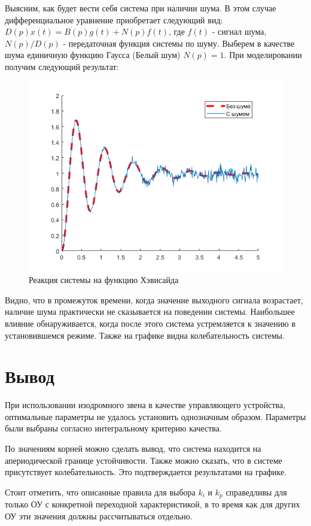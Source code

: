 \FloatBarrier

Выясним, как будет вести себя система при наличии шума. В этом случае
дифференциальное уравнение приобретает следующий вид:
$D(p)x(t) = B(p)g(t) + N(p)f(t)$, где $f(t)$ - сигнал шума, $N(p)/D(p)$ - передаточная
функция системы по шуму.
Выберем в качестве шума единичную функцию Гаусса (Белый шум) $N(p) = 1$.
При моделировании получим следующий результат:

\begin{figure}[h!]
	\centering
	\includegraphics[scale = 0.70]{images/result.png}
	\caption{Реакция системы на функцию Хэвисайда}
	\label{image:9}
\end{figure}
\FloatBarrier
Видно, что в промежуток времени, когда значение выходного сигнала возрастает, наличие шума практически не сказывается на поведении системы. Наибольшее
влияние обнаруживается, когда после этого система устремляется к значению в установившемся режиме. Также на графике видна колебательность системы.

\section{Вывод}

При использовании изодромного звена в качестве управляющего устройства, оптимальные параметры не удалось установить однозначным образом.  Параметры были выбраны согласно
интегральному критерию качества.

По значениям корней можно сделать вывод, что система находится на апериодической границе
устойчивости. Также можно сказать, что в системе присутствует колебательность. Это
подтверждается результатами на графике.

Стоит отметить, что описанные правила для выбора $k_i$ и $k_p$ справедливы для только ОУ с конкретной переходной характеристикой, в то время как для других ОУ эти значения должны рассчитываться отдельно.


